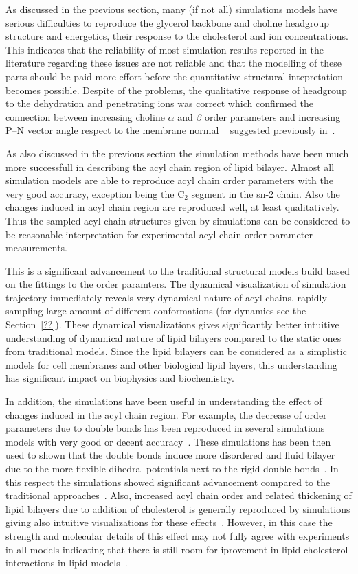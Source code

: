 \documentclass[aps,prl,superscriptaddress,twocolumn]{revtex4}
\begin{document}
As discussed in the previous section, many (if not all) simulations models have serious difficulties
to reproduce the glycerol backbone and choline headgroup structure and energetics, their response
to the cholesterol and ion concentrations. This indicates that the reliability of most simulation results 
reported in the literature regarding these issues are not reliable and that the modelling of these
parts should be paid more effort before the quantitative structural intepretation becomes possible.
Despite of the problems, the qualitative response of headgroup to the dehydration and penetrating ions
was correct which confirmed the connection between increasing choline $\alpha$ and $\beta$ order parameters
and increasing P--N vector angle respect to the membrane normal ~\cite{??} suggested previously in~\cite{??}.

As also discussed in the previous section the simulation methods have been much more successfull in describing
the acyl chain region of lipid bilayer. Almost all simulation models are able to reproduce acyl chain
order parameters with the very good accuracy, exception being the C$_2$ segment in the sn-2 chain.
Also the changes induced in acyl chain region are reproduced well, at least qualitatively.
Thus the sampled acyl chain structures given by simulations can be considered to be reasonable
interpretation for experimental acyl chain order parameter measurements. 

This is a significant advancement to the traditional structural models build based on the 
fittings to the order paramters. The dynamical visualization of simulation trajectory immediately 
reveals very dynamical nature of acyl chains, rapidly sampling large amount of different conformations 
(for dynamics see the Section~\ref{??}). These dynamical visualizations gives significantly better
intuitive understanding of dynamical nature of lipid bilayers compared to the static ones from 
traditional models. Since the lipid bilayers can be considered as a simplistic models for cell
membranes and other biological lipid layers, this understanding has significant impact on
biophysics and biochemistry. 

In addition, the simulations have been useful in understanding the effect of changes induced 
in the acyl chain region. For example, the decrease of order parameters due to double bonds 
has been reproduced in several simulations models with very good or decent accuracy~\cite{??}.
These simulations has been then used to shown that the double bonds induce more disordered
and fluid bilayer due to the more flexible dihedral potentials next to the rigid double bonds~\cite{??}.
In this respect the simulations showed significant advancement compared to the traditional 
approaches~\cite{??}. Also, increased acyl chain order and related thickening
of lipid bilayers due to addition of cholesterol is generally reproduced by simulations giving
also intuitive visualizations for these effects~\cite{??}. However, in this case the 
strength and molecular details of this effect may not fully agree with experiments in all models
indicating that there is still room for iprovement in lipid-cholesterol interactions in lipid
models~\cite{??}.
\end{document}
